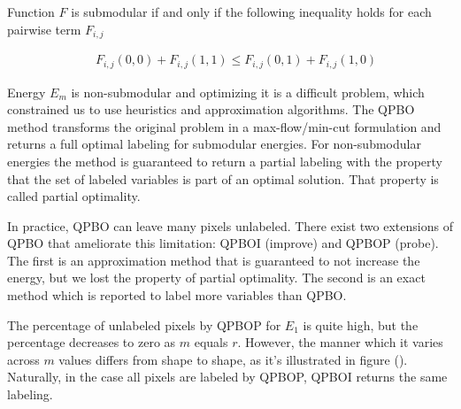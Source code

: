 \documentclass[runningheads]{llncs}
\begin{document}
Function $F$ is submodular if and only if the following inequality holds for each pairwise term $F_{i,j}$ \cite{kolmogorov04whatenergies}

\begin{align*}
	\quad F_{i,j}(0,0) + F_{i,j}(1,1) \leq F_{i,j}(0,1) + F_{i,j}(1,0)
\end{align*}

Energy $E_m$ is non-submodular and optimizing it is a difficult problem, which
constrained us to use heuristics and approximation algorithms. The QPBO method \cite{rother07qpbo} transforms the 
original problem in a max-flow/min-cut formulation and returns a full optimal labeling for submodular energies. For
non-submodular energies the method is guaranteed to return a partial labeling with the property that the set of labeled
variables is part of an optimal solution. That property is called partial optimality.

In practice, QPBO can leave many pixels unlabeled. There exist two extensions of QPBO that ameliorate this limitation: QPBOI
(improve) and QPBOP (probe). The first is an approximation method that is guaranteed to not increase the energy, but we
lost the property of partial optimality. The second is an exact method which is reported to label more variables than
QPBO. 

The percentage of unlabeled pixels by QPBOP for $E_1$ is quite high, but the percentage decreases to zero as $m$ equals $r$. However, the manner which it varies across $m$ values differs from shape to shape, as it's illustrated in figure (). Naturally, in the case all pixels are labeled by QPBOP, QPBOI returns the same labeling. 
\end{document}
